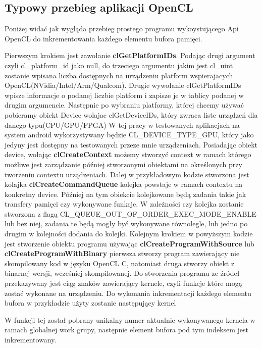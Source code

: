 \subsection{Typowy przebieg aplikacji OpenCL}
Poniżej widać jak wygląda przebieg prostego programu wykoystującego Api OpenCL do inkrementowania każdego elementu bufora pamięci.



Pierwszym krokiem jest zawołanie \textbf{clGetPlatformIDs}. Podając drugi argument czyli cl\_platform\_id\* jako null, do trzeciego argumentu jakim jest cl\_uint\* zostanie wpisana liczba dostępnych na urządzeniu platform wspierajacych OpenCL(NVidia/Intel/Arm/Qualcom).
Drugie wywołanie clGetPlatformIDs wpisze informacje o podanej liczbie platform i zapisze je w tablicy podanej w drugim argumencie.
Następnie po wybraniu platformy, której chcemy używać pobieramy obiekt Device wolajac clGetDeviceIDs, który zwraca liste urządzeń dla danego typu(CPU/GPU/FPGA)
W tej pracy w testowanych aplikacjach na system android wykorzystywany będzie CL\_DEVICE\_TYPE\_GPU, który jako jedyny jest dostępny na testowanych przeze mnie urządzeniach.
Posiadając obiekt device, wołając \textbf{clCreateContext} możemy stworzyć context w ramach którego możliwe jest zarządzanie później stworzonymi obiektami na określonych przy tworzeniu contextu urządzeniach.
Dalej w przykładowym kodzie stworzona jest kolajka \textbf{clCreateCommandQueue} kolejka powstaje w ramach contextu na konkretny device. Później na tym obiekcie kolejkowane będą zadania takie jak transfery pamięci czy wykonywane funkcje. W zależności czy kolejka zostanie stworzona z flagą CL\_QUEUE\_OUT\_OF\_ORDER\_EXEC\_MODE\_ENABLE lub bez niej, zadania te będą mogły być wykonywane równolegle, lub jedno po drugim w kolejności dodania do kolejki.
Kolejnym krokiem w powyższym kodzie jest stworzenie obiektu programu używając \textbf{clCreateProgramWithSource} lub \textbf{clCreateProgramWithBinary} pierwsza stworzy program zawierający nie skompilowany kod w języku OpenCL C, natomiast druga stworzy obiekt z binarnej wersji, wcześniej skompilowanej. Do stworzenia programu ze źródeł przekazywany jest ciąg znaków zawierający kernele, czyli funkcje które mogą zostać wykonane na urządzeniu.
Do wykonania inkrementacji każdego elementu bufora w przykładzie użyty zostanie następujący kernel

W funkcji tej został pobrany unikalny numer aktualnie wykonywanego kernela w ramach globalnej work grupy, następnie element bufora pod tym indeksem jest inkrementowany. 
